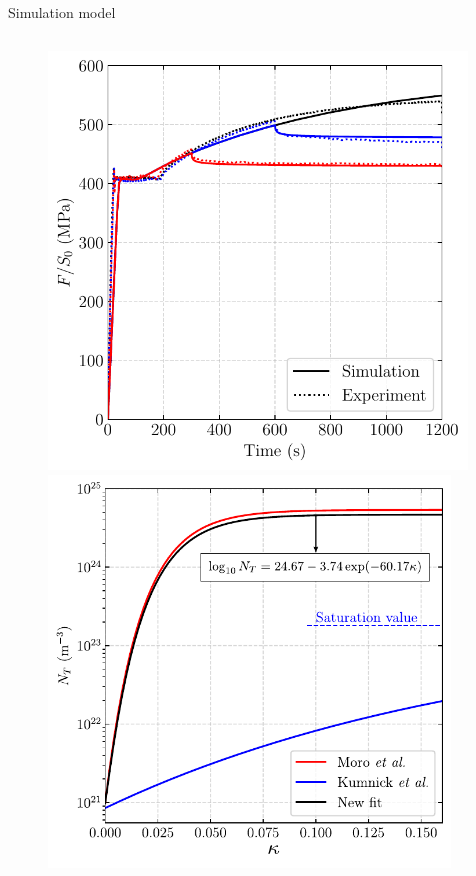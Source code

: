 \documentclass[9pt]{beamer}
\begin{document}
\begin{frame}{Simulation model}
\begin{columns}
\begin{column}{0.35\textwidth}
	\begin{figure}
		\centering
		\includegraphics[width=0.99\textwidth]{Images/plot_time_stress.pdf} \\
		\includegraphics[width=0.95\textwidth]{Images/NT_TDS.pdf}
	\end{figure}
\end{column}

\end{columns}

\end{frame}
\end{document}
